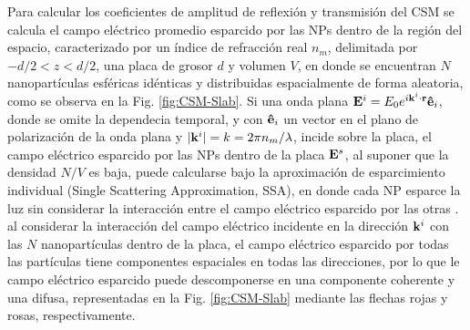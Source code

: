 Para calcular los coeficientes de amplitud de reflexión y transmisión del CSM se calcula el campo eléctrico promedio esparcido por las NPs dentro de la región del espacio, caracterizado por un índice de refracción real $n_m$, delimitada por  $-d/2<z<d/2$, una placa de grosor $d$ y volumen $V$, en donde se encuentran $N$ nanopartículas esféricas idénticas y distribuidas espacialmente de forma aleatoria, como se observa en la Fig. \ref{fig:CSM-Slab}. Si una onda plana $\vb{E}^i = E_0 e^{i\vb{k}^i\cdot\vb{r}}\vu{e}_i$, donde se omite la dependecia temporal, y con $\vu{e}_i$ un vector en el plano de polarización de la onda plana y $|\vb{k}^i| = k = 2\pi n_m /\lambda$, incide sobre la placa, el campo eléctrico esparcido  por las NPs dentro de la placa $\vb{E}^s$, al suponer que la densidad $N/V$ es baja, puede calcularse bajo la aproximación de esparcimiento individual (Single Scattering Approximation, SSA), en donde cada NP esparce la luz sin considerar la interacción entre el campo eléctrico esparcido por las otras \cite{barrera2003coherent}. al considerar la interacción del campo eléctrico incidente en la dirección $\vb{k}^i$ con las $N$ nanopartículas dentro de la placa, el campo eléctrico esparcido por todas las partículas tiene componentes espaciales en todas las direcciones, por lo que le campo eléctrico esparcido puede descomponerse en una componente coherente y una difusa, representadas en la Fig. \ref{fig:CSM-Slab} mediante las flechas rojas y rosas, respectivamente.

